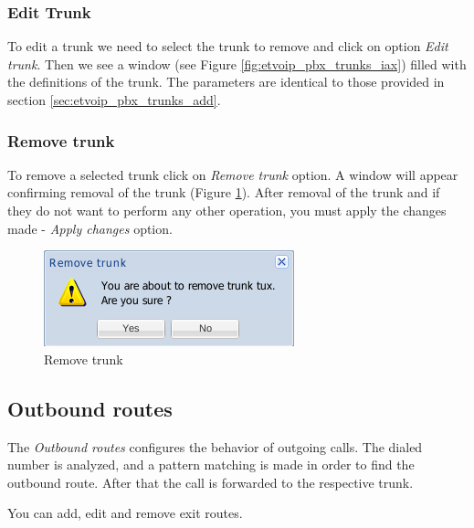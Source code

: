 \subsubsection{Edit Trunk}

To edit a trunk we need to select the trunk to remove and click on option \emph{Edit trunk}. Then we see a window (see Figure \ref{fig:etvoip_pbx_trunks_iax}) filled with the definitions of the trunk.
The parameters are identical to those provided in section \ref{sec:etvoip_pbx_trunks_add}.

\subsubsection{Remove trunk}

To remove a selected trunk click on \emph{Remove trunk} option.
A window will appear confirming removal of the trunk (Figure \ref{fig:etvoip_pbx_trunks_remove}). After removal of the trunk and if they do not want to perform any other operation, you must apply the changes made - \emph{Apply changes} option.

\begin{figure}[H]
        \begin{center}
        \includegraphics[scale=0.6]{screenshots/etvoip_pbx_trunks_remove.png}
        \caption{Remove trunk}
        \label{fig:etvoip_pbx_trunks_remove}
        \end{center}
\end{figure}


\subsection{Outbound routes}
The \emph{Outbound routes} configures the behavior of outgoing calls. The dialed number is analyzed, and a pattern matching is made in order to find the outbound route. After that the call is forwarded to the respective trunk.

You can add, edit and remove exit routes.

